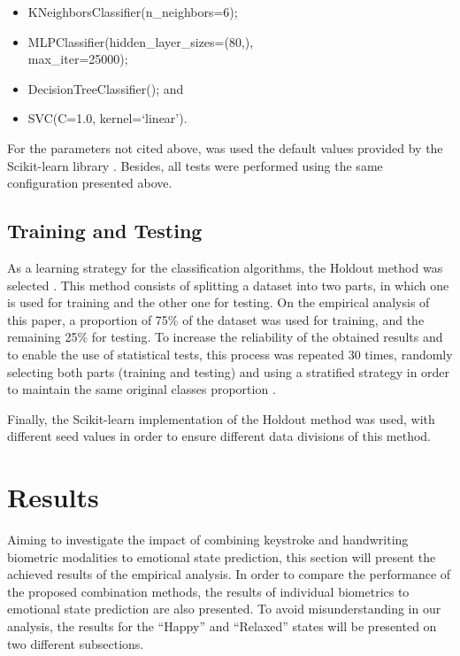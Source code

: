 \documentclass[conference]{IEEEtran}
\begin{document}
\begin{itemize}
    \item KNeighborsClassifier(n\_neighbors=6);
    \item MLPClassifier(hidden\_layer\_sizes=(80,), \\ 
    max\_iter=25000);
    \item DecisionTreeClassifier(); and
    \item SVC(C=1.0, kernel=`linear').
\end{itemize}

For the parameters not cited above, was used the default values provided by the Scikit-learn library \cite{sklearn}. Besides, all tests were performed using the same configuration presented above.

\subsection{Training and Testing}

As a learning strategy for the classification algorithms, the Holdout method was selected \cite{validation}. This method consists of splitting a dataset into two parts, in which one is used for training and the other one for testing. On the empirical analysis of this paper, a proportion of 75\% of the dataset was used for training, and the remaining 25\% for testing. 
To increase the reliability of the obtained results and to enable the use of statistical tests, this process was repeated 30 times, randomly selecting both parts (training and testing) and using a stratified strategy in order to maintain the same original classes proportion \cite{faceli}.


Finally, the Scikit-learn implementation of the Holdout method was used, with different seed values in order to ensure different data divisions of this method. 




\section{Results}

Aiming to investigate the impact of combining keystroke and handwriting biometric modalities to emotional state prediction, this section will present the achieved results of the empirical analysis. In order to compare the performance of the proposed combination methods, the results of individual biometrics to emotional state prediction are also presented. To avoid misunderstanding in our analysis, the results for the ``Happy'' and ``Relaxed'' states will be presented on two different subsections.
\end{document}
